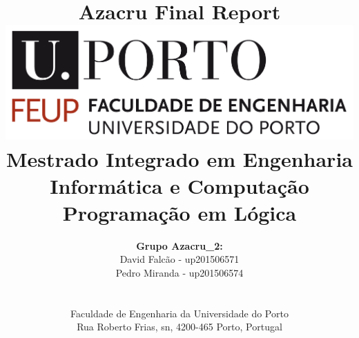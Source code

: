 \documentclass[a4paper]{article}
\begin{document}
\setlength{\textwidth}{16cm}
\setlength{\textheight}{22cm}

\title{\Huge\textbf{Azacru}\linebreak\linebreak\linebreak
\Large\textbf{Final Report}\linebreak\linebreak
\linebreak\linebreak
\includegraphics[scale=0.1]{feup-logo.png}\linebreak\linebreak
\linebreak\linebreak
\Large{Mestrado Integrado em Engenharia Informática e Computação} \linebreak\linebreak
\Large{Programação em Lógica}\linebreak
}

\author{\textbf{Grupo Azacru\_2:}\\ David Falcão - up201506571 \\ Pedro Miranda - up201506574 \\\linebreak\linebreak \\
 \\ Faculdade de Engenharia da Universidade do Porto \\ Rua Roberto Frias, s\/n, 4200-465 Porto, Portugal \linebreak\linebreak\linebreak
\linebreak\linebreak\vspace{1cm}}
\maketitle
\thispagestyle{empty}
\end{document}
